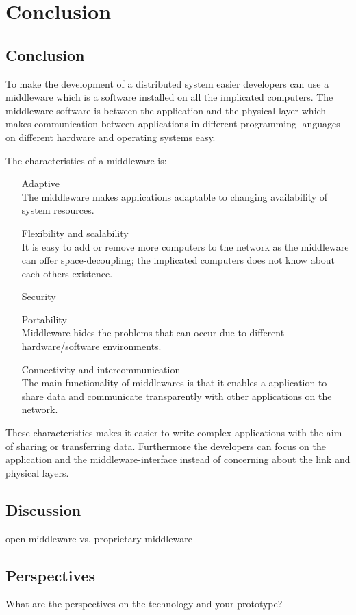 \documentclass[Main]{subfiles}
\begin{document}
\chapter{Conclusion}

\section{Conclusion}
To make the development of a distributed system easier developers can use a middleware which is a software installed on all the implicated computers. The middleware-software is between the application and the physical layer which makes communication between applications in different programming languages on different hardware and operating systems easy.

The characteristics of a middleware is:
\begin{itemize}
\item[Adaptive]\\The middleware makes applications adaptable to changing availability of system resources.
\item[Flexibility and scalability]\\It is easy to add or remove more computers to the network as the middleware can offer space-decoupling; the implicated computers does not know about each others existence.
\item[Security]\\
\item[Portability]\\Middleware hides the problems that can occur due to different hardware/software environments.
\item[Connectivity and intercommunication]\\The main functionality of middlewares is that it enables a application to share data and communicate transparently with other applications on the network.
\end{itemize}

These characteristics makes it easier to write complex applications with the aim of sharing or transferring data. Furthermore the developers can focus on the application and the middleware-interface instead of concerning about the link and physical layers.

\section{Discussion}
open middleware vs. proprietary middleware

\section{Perspectives}
What are the perspectives on the technology and your prototype? 
\end{document}
